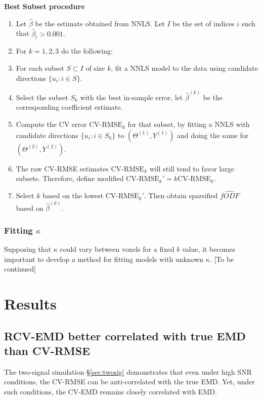 \documentclass[11pt]{article}
\begin{document}
\noindent\textbf{Best Subset procedure}
\begin{enumerate}
\item Let $\hat{\beta}$ be the estimate obtained from NNLS.  Let $I$
  be the set of indices $i$ such that $\hat{\beta}_i > 0.001$.
\item For $k=1,2,3$ do the following:
\item For each subset $S \subset I$ of size $k$, fit a NNLS model to
  the data using candidate directions $\{u_i: i \in S\}$.
\item Select the subset $S_k$ with the best in-sample error, let
  $\hat{\beta}^{(k)}$ be the corresponding coefficient estimate.
\item Compute the CV error $\text{CV-RMSE}_k$ for that subset, by
  fitting a NNLS with candidate directions $\{u_i: i \in S_k\}$ to
  $(\Theta^{(1)},Y^{(1)})$ 
and doing the same for $(\Theta^{(2)},Y^{(2)})$. 
\item The raw CV-RMSE estimates  $\text{CV-RMSE}_k$ will still tend to
  favor large subsets.  Therefore, define modified $\text{CV-RMSE}_k'
  = k \text{CV-RMSE}_k$.
\item Select $k$ based on the lowest $\text{CV-RMSE}_k'$.
Then obtain sparsified $\hat{fODF}$ based on $\hat{\beta}^{(k)}$.
\end{enumerate}

\subsubsection{Fitting $\kappa$}

Supposing that $\kappa$ could vary between voxels for a fixed $b$
value,
it becomes important to develop a method for fitting models with
unknown $\kappa$.
[To be continued]

\section{Results}

\subsection[RCV-EMD correlated]{RCV-EMD better correlated with true EMD than CV-RMSE}

The two-signal simulation \S\ref{sec:twosig} demonstrates that even
under high SNR conditions, the CV-RMSE can be anti-correlated with the true
EMD.  Yet, under such conditions, the CV-EMD remains closely
correlated with EMD.
\end{document}
